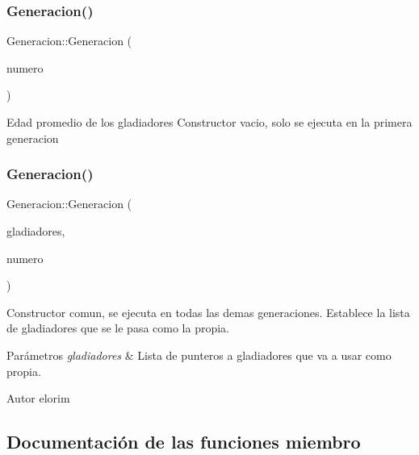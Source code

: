 \subsubsection{\texorpdfstring{Generacion()}{Generacion()}\hspace{0.1cm}{\footnotesize\ttfamily [1/2]}}
{\footnotesize\ttfamily Generacion\+::\+Generacion (\begin{DoxyParamCaption}\item[{int}]{numero }\end{DoxyParamCaption})}

Edad promedio de los gladiadores Constructor vacio, solo se ejecuta en la primera generacion \mbox{\label{classGeneracion_a07c8c32db2bdc4e77057b8f7a4f28a75}} 
\subsubsection{\texorpdfstring{Generacion()}{Generacion()}\hspace{0.1cm}{\footnotesize\ttfamily [2/2]}}
{\footnotesize\ttfamily Generacion\+::\+Generacion (\begin{DoxyParamCaption}\item[{\hyperlink{classLinkedList}{Linked\+List}$<$ \hyperlink{classGladiator}{Gladiator} $\ast$$>$}]{gladiadores,  }\item[{int}]{numero }\end{DoxyParamCaption})}

Constructor comun, se ejecuta en todas las demas generaciones. Establece la lista de gladiadores que se le pasa como la propia. 
\begin{DoxyParams}{Parámetros}
{\em gladiadores} & Lista de punteros a gladiadores que va a usar como propia. \\
\hline
\end{DoxyParams}
\begin{DoxyAuthor}{Autor}
elorim 
\end{DoxyAuthor}


\subsection{Documentación de las funciones miembro}
\mbox{\label{classGeneracion_adc5987dbce136c83c2f54faf5c3e9b46}} 
